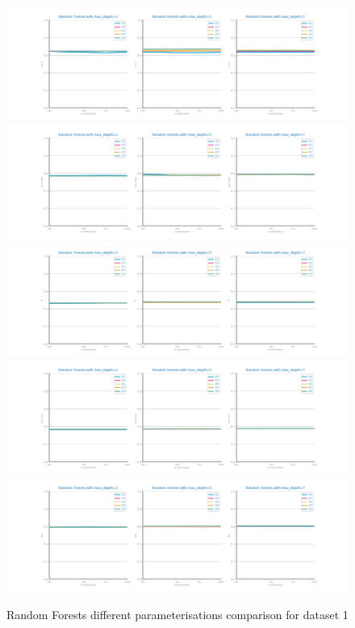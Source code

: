 \documentclass[10pt]{extarticle}
\begin{document}
\begin{figure}[H]
\centering\includegraphics[scale=0.6]{images/dataset1/models_evaluation/CovidPos_rf_recall_study.png}
\includegraphics[scale=0.6]{images/dataset1/models_evaluation/CovidPos_rf_accuracy_study.png}
\includegraphics[scale=0.6]{images/dataset1/models_evaluation/CovidPos_rf_f1_study.png}
\includegraphics[scale=0.6]{images/dataset1/models_evaluation/CovidPos_rf_precision_study.png}
\includegraphics[scale=0.6]{images/dataset1/models_evaluation/CovidPos_rf_auc_study.png}
\caption{Random Forests different parameterisations comparison for dataset 1}
\end{figure}
\end{document}
